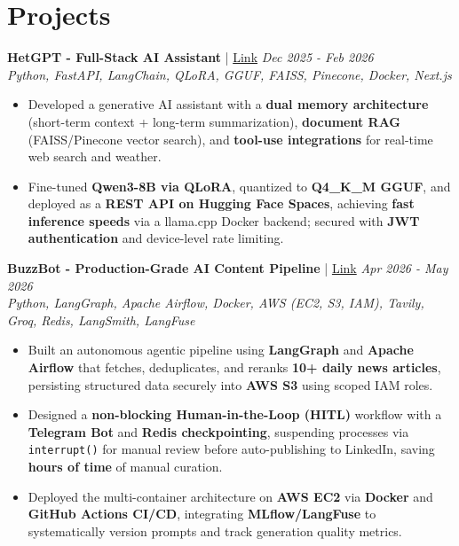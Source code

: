 \documentclass[a4paper,10pt]{article}
\begin{document}
\section*{Projects}

\textbf{HetGPT - Full-Stack AI Assistant} | \href{https://github.com/hetbhalani/HetGPT}{Link} \hfill \textit{Dec 2025 - Feb 2026} \\
\textit{Python, FastAPI, LangChain, QLoRA, GGUF, FAISS, Pinecone, Docker, Next.js}
\begin{itemize}[leftmargin=2em]
    \item Developed a generative AI assistant with a \textbf{dual memory architecture} (short-term context + long-term summarization), \textbf{document RAG} (FAISS/Pinecone vector search), and \textbf{tool-use integrations} for real-time web search and weather.
    \item Fine-tuned \textbf{Qwen3-8B via QLoRA}, quantized to \textbf{Q4\_K\_M GGUF}, and deployed as a \textbf{REST API on Hugging Face Spaces}, achieving \textbf{fast inference speeds} via a llama.cpp Docker backend; secured with \textbf{JWT authentication} and device-level rate limiting.
\end{itemize}

\textbf{BuzzBot - Production-Grade AI Content Pipeline} | \href{https://github.com/hetbhalani/BuzzBot}{Link} \hfill \textit{Apr 2026 - May 2026} \\
\textit{Python, LangGraph, Apache Airflow, Docker, AWS (EC2, S3, IAM), Tavily, Groq, Redis, LangSmith, LangFuse}
\begin{itemize}[leftmargin=2em]
    \item Built an autonomous agentic pipeline using \textbf{LangGraph} and \textbf{Apache Airflow} that fetches, deduplicates, and reranks \textbf{10+ daily news articles}, persisting structured data securely into \textbf{AWS S3} using scoped IAM roles.
    \item Designed a \textbf{non-blocking Human-in-the-Loop (HITL)} workflow with a \textbf{Telegram Bot} and \textbf{Redis checkpointing}, suspending processes via \texttt{interrupt()} for manual review before auto-publishing to LinkedIn, saving \textbf{hours of time} of manual curation.
    \item Deployed the multi-container architecture on \textbf{AWS EC2} via \textbf{Docker} and \textbf{GitHub Actions CI/CD}, integrating \textbf{MLflow/LangFuse} to systematically version prompts and track generation quality metrics.
\end{itemize}
\end{document}
